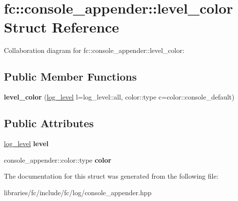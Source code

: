 \hypertarget{structfc_1_1console__appender_1_1level__color}{}\section{fc\+:\+:console\+\_\+appender\+:\+:level\+\_\+color Struct Reference}
\label{structfc_1_1console__appender_1_1level__color}


Collaboration diagram for fc\+:\+:console\+\_\+appender\+:\+:level\+\_\+color\+:
\subsection*{Public Member Functions}
\begin{DoxyCompactItemize}
\item 
\mbox{\label{structfc_1_1console__appender_1_1level__color_ab8cc6ad1bc2187e70710ce9f38bc2e60}} 
{\bfseries level\+\_\+color} (\mbox{\hyperlink{classfc_1_1log__level}{log\+\_\+level}} l=log\+\_\+level\+::all, color\+::type c=color\+::console\+\_\+default)
\end{DoxyCompactItemize}
\subsection*{Public Attributes}
\begin{DoxyCompactItemize}
\item 
\mbox{\label{structfc_1_1console__appender_1_1level__color_a2bc69990b0da10c38fb1ac4f2f1f0cd1}} 
\mbox{\hyperlink{classfc_1_1log__level}{log\+\_\+level}} {\bfseries level}
\item 
\mbox{\label{structfc_1_1console__appender_1_1level__color_a7599e06ae0da48421475bd5ecb058772}} 
console\+\_\+appender\+::color\+::type {\bfseries color}
\end{DoxyCompactItemize}


The documentation for this struct was generated from the following file\+:\begin{DoxyCompactItemize}
\item 
libraries/fc/include/fc/log/console\+\_\+appender.\+hpp\end{DoxyCompactItemize}
